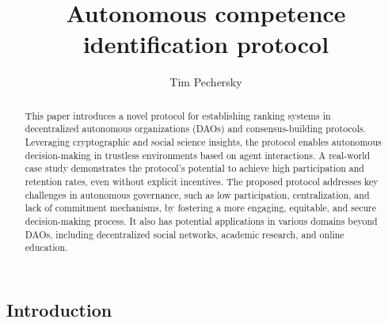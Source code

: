 \documentclass{article}
\title{Autonomous competence identification protocol}
\author{Tim Pechersky}
\begin{document}
\begin{CJK}{UTF8}{gbsn}

    \maketitle


    \begin{abstract}
        This paper introduces a novel protocol for establishing ranking systems in decentralized autonomous organizations (DAOs) and consensus-building protocols. Leveraging cryptographic and social science insights, the protocol enables autonomous decision-making in trustless environments based on agent interactions. A real-world case study demonstrates the protocol's potential to achieve high participation and retention rates, even without explicit incentives. The proposed protocol addresses key challenges in autonomous governance, such as low participation, centralization, and lack of commitment mechanisms, by fostering a more engaging, equitable, and secure decision-making process. It also has potential applications in various domains beyond DAOs, including decentralized social networks, academic research, and online education.
    \end{abstract}
    \begin{multicols}{2}

        \section{Introduction}


\end{multicols}
\end{CJK}
\end{document}
